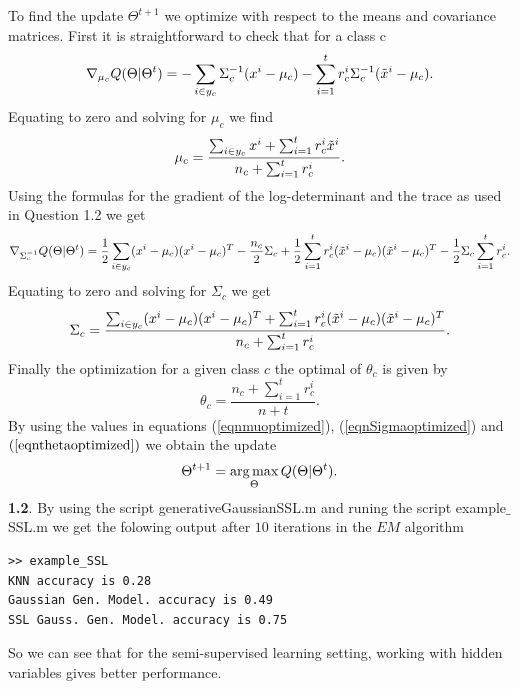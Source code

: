 \documentclass{article}
\begin{document}
To find the update $\Theta^{t+1}$ we optimize with respect to the means and covariance matrices. First it is straightforward to check that for a class c
\begin{equation*}
\nabla_{\mu_{c}}Q(\Theta|\Theta^{t})=-\sum_{i\in y_{c}}\Sigma_{c}^{-1}(x^{i}-\mu_{c})-\sum_{i=1}^{t}r^{i}_{c}\Sigma_{c}^{-1}(\tilde{x}^{i}-\mu_{c}).
\end{equation*}
Equating to zero and solving for $\mu_{c}$ we find
\begin{equation}\label{eqnmuoptimized}
\mu_{c}=\frac{\sum_{i\in y_{c}}x^{i}+\sum_{i=1}^{t}r^{i}_{c}\tilde{x}^{i}}{n_{c}+\sum_{i=1}^{t}r^{i}_{c}}.
\end{equation}
Using the formulas for the gradient of the log-determinant and the trace as used in Question 1.2 we get
\begin{equation*}
\nabla_{\Sigma_{c}^{-1}}Q(\Theta|\Theta^{t})=\frac{1}{2}\sum_{i\in y_{c}}(x^{i}-\mu_{c})(x^{i}-\mu_{c})^{T}-\frac{n_{c}}{2}\Sigma_{c}+
\frac{1}{2}\sum_{i=1}^{t}r^{i}_{c}(\tilde{x}^{i}-\mu_{c})(\tilde{x}^{i}-\mu_{c})^{T}-\frac{1}{2}\Sigma_{c}\sum_{i=1}^{t}r^{i}_{c}.
\end{equation*}
Equating to zero and solving for $\Sigma_{c}$ we get
\begin{equation}\label{eqnSigmaoptimized}
\Sigma_{c}=\frac{\sum_{i\in y_{c}}(x^{i}-\mu_{c})(x^{i}-\mu_{c})^{T}+\sum_{i=1}^{t}r^{i}_{c}(\tilde{x}^{i}-\mu_{c})(\tilde{x}^{i}-\mu_{c})^{T}}{n_{c}+\sum_{i=1}^{t}r^{i}_{c}}.
\end{equation}
Finally the optimization for a given class $c$  the optimal of  $\theta_{c}$ is given by
\begin{equation}\label{eqnthetaoptimized} \theta_{c}=\frac{n_{c}+\sum_{i=1}^{t}r^{i}_{c}}{n+t}.
\end{equation}
By using the values in equations (\ref{eqnmuoptimized}), (\ref{eqnSigmaoptimized}) and $(\ref{eqnthetaoptimized})$  we obtain the update
\begin{equation*}
\Theta^{t+1}=\mathop{\rm arg\,max}_{\Theta}Q(\Theta|\Theta^{t}).
\end{equation*}
\newpage
\textbf{1.2}. 
\newline
By using the script generativeGaussianSSL.m and runing the script example$\_$SSL.m we get the folowing output after $10$ iterations in the $EM$ algorithm
\begin{verbatim}
>> example_SSL
KNN accuracy is 0.28
Gaussian Gen. Model. accuracy is 0.49
SSL Gauss. Gen. Model. accuracy is 0.75
\end{verbatim}

So we can see that for the semi-supervised learning setting, working with hidden variables gives better performance.
\newline
\end{document}
